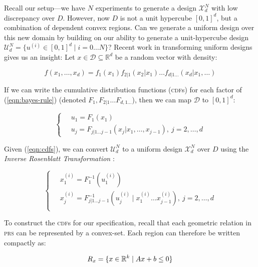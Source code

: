 \documentclass[sigplan, screen]{acmart} %
\newcommand{\expD}{\mathcal{X}^{N}_d}
\newcommand{\uniD}{\mathcal{U}^{N}_d}
\begin{document}
Recall our setup---we have $N$ experiments to generate a design $\expD$ with low discrepancy over $D$. However, now $D$ is not a unit hypercube $[0,1]^d$, but a combination of dependent convex regions. Can we generate a uniform design over this new domain by building on our ability to generate a unit-hypercube design $\uniD = \{ u^{(i)} \in [0,1]^d \mid i = 0 \dots N \}$? Recent work in transforming uniform designs gives us an insight: Let $x \in \mathcal{D} \subseteq \mathbb{R}^d$ be a random vector with density:

\begin{equation}
    f(x_1, \dots, x_d) = f_1(x_1)f_{2|1}(x_2 | x_1) \dots f_{d|1\dots}(x_d | x_1, \dots)
    \label{eqn:bayes-rule}
\end{equation}

If we can write the cumulative distribution functions (\textsc{cdf}s) for each factor of (\ref{eqn:bayes-rule}) (denoted $F_{1}, F_{2|1} \dots F_{d, 1\dots}$), then we can map $\mathcal{D}$ to $[0,1]^d$:

\begin{equation}
\begin{cases}
    \quad u_1 = F_1(x_1) \\
    \quad u_j = F_{j | 1 \dots j-1}(x_j | x_1, \dots, x_{j-1}),\ j=2,\dots, d
\end{cases}
\label{eqn:cdfs}
\end{equation}

Given (\ref{eqn:cdfs}), we can convert $\uniD$ to a uniform design $\expD$ over $D$ using the \emph{Inverse Rosenblatt Transformation} \cite{zhang2020construction}: 

\begin{equation}
\begin{cases}
    \quad x^{(i)}_1 = F_{1}^{-1}(u^{(i)}_1) \\
    \quad x^{(i)}_j = F_{j|1 \dots j-1}^{-1}(u_j^{(i)} \mid x^{(i)}_1 \dots x^{(i)}_{j-1}),\  j = 2,\dots,d \\
\end{cases}
\label{eqn:inv-cdf}
\end{equation}

To construct the \textsc{cdf}s for our specification, recall that each geometric relation in \textsc{prs} can be represented by a convex-set. Each region can therefore be written compactly as: 

\begin{equation}
    R_{x} = \{x \in \mathbb{R}^k \mid Ax + b \leq 0 \} \\
\label{eqn:regions}
\end{equation}
\end{document}
